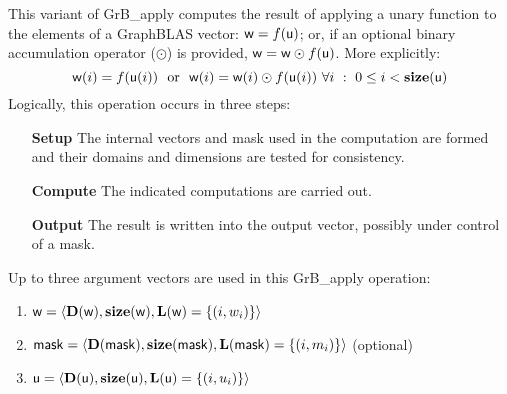This variant of {\sf GrB\_apply} computes the result of applying a unary function
to the elements of a GraphBLAS vector:
${\sf w} = f({\sf u})$; or, if an optional binary accumulation 
operator ($\odot$) is provided, ${\sf w} = {\sf w} \odot f({\sf u})$.  
More explicitly:
\[
	{\sf w}(i) = f({\sf u}(i)) \mbox{~~or~~} 
    {\sf w}(i) = {\sf w}(i) \odot f({\sf u}(i))
    \ \forall i \ : \ 0 \leq i < \bold{size}({\sf u})
\]  
Logically, this operation occurs in three steps:
\begin{enumerate}[leftmargin=0.75in]
\item[\bf Setup] The internal vectors and mask used in the computation are formed 
and their domains and dimensions are tested for consistency.
\item[\bf Compute] The indicated computations are carried out.
\item[\bf Output] The result is written into the output vector, possibly under 
control of a mask.
\end{enumerate}

Up to three argument vectors are used in this {\sf GrB\_apply} operation:
\begin{enumerate}
	\item ${\sf w} = \langle \bold{D}({\sf w}),\bold{size}({\sf w}),
    \bold{L}({\sf w}) = \{(i,w_i) \} \rangle$

	\item ${\sf mask} = \langle \bold{D}({\sf mask}),\bold{size}({\sf mask}),
    \bold{L}({\sf mask}) = \{(i,m_i) \} \rangle$ (optional)

	\item ${\sf u} = \langle \bold{D}({\sf u}),\bold{size}({\sf u}),
    \bold{L}({\sf u}) = \{(i,u_i) \} \rangle$
\end{enumerate}

